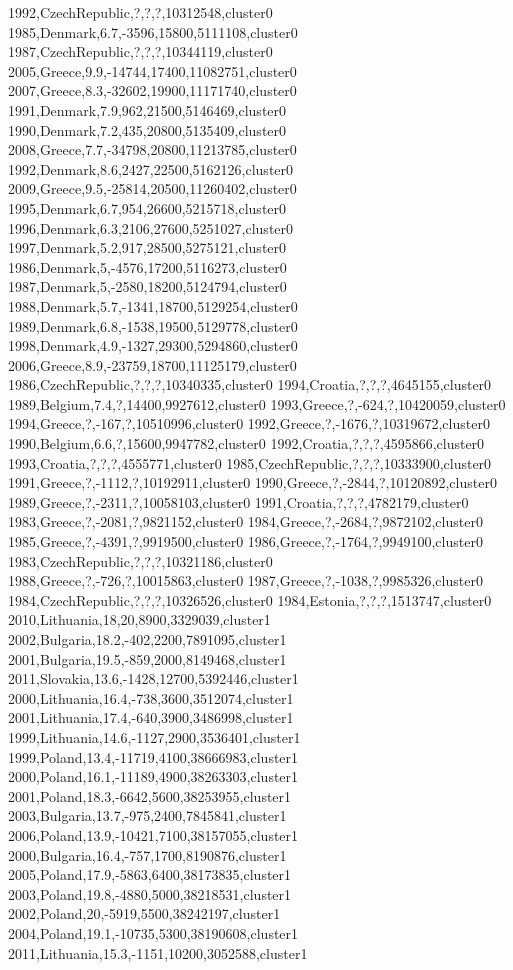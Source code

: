 1992,CzechRepublic,?,?,?,10312548,cluster0
1985,Denmark,6.7,-3596,15800,5111108,cluster0
1987,CzechRepublic,?,?,?,10344119,cluster0
2005,Greece,9.9,-14744,17400,11082751,cluster0
2007,Greece,8.3,-32602,19900,11171740,cluster0
1991,Denmark,7.9,962,21500,5146469,cluster0
1990,Denmark,7.2,435,20800,5135409,cluster0
2008,Greece,7.7,-34798,20800,11213785,cluster0
1992,Denmark,8.6,2427,22500,5162126,cluster0
2009,Greece,9.5,-25814,20500,11260402,cluster0
1995,Denmark,6.7,954,26600,5215718,cluster0
1996,Denmark,6.3,2106,27600,5251027,cluster0
1997,Denmark,5.2,917,28500,5275121,cluster0
1986,Denmark,5,-4576,17200,5116273,cluster0
1987,Denmark,5,-2580,18200,5124794,cluster0
1988,Denmark,5.7,-1341,18700,5129254,cluster0
1989,Denmark,6.8,-1538,19500,5129778,cluster0
1998,Denmark,4.9,-1327,29300,5294860,cluster0
2006,Greece,8.9,-23759,18700,11125179,cluster0
1986,CzechRepublic,?,?,?,10340335,cluster0
1994,Croatia,?,?,?,4645155,cluster0
1989,Belgium,7.4,?,14400,9927612,cluster0
1993,Greece,?,-624,?,10420059,cluster0
1994,Greece,?,-167,?,10510996,cluster0
1992,Greece,?,-1676,?,10319672,cluster0
1990,Belgium,6.6,?,15600,9947782,cluster0
1992,Croatia,?,?,?,4595866,cluster0
1993,Croatia,?,?,?,4555771,cluster0
1985,CzechRepublic,?,?,?,10333900,cluster0
1991,Greece,?,-1112,?,10192911,cluster0
1990,Greece,?,-2844,?,10120892,cluster0
1989,Greece,?,-2311,?,10058103,cluster0
1991,Croatia,?,?,?,4782179,cluster0
1983,Greece,?,-2081,?,9821152,cluster0
1984,Greece,?,-2684,?,9872102,cluster0
1985,Greece,?,-4391,?,9919500,cluster0
1986,Greece,?,-1764,?,9949100,cluster0
1983,CzechRepublic,?,?,?,10321186,cluster0
1988,Greece,?,-726,?,10015863,cluster0
1987,Greece,?,-1038,?,9985326,cluster0
1984,CzechRepublic,?,?,?,10326526,cluster0
1984,Estonia,?,?,?,1513747,cluster0
2010,Lithuania,18,20,8900,3329039,cluster1
2002,Bulgaria,18.2,-402,2200,7891095,cluster1
2001,Bulgaria,19.5,-859,2000,8149468,cluster1
2011,Slovakia,13.6,-1428,12700,5392446,cluster1
2000,Lithuania,16.4,-738,3600,3512074,cluster1
2001,Lithuania,17.4,-640,3900,3486998,cluster1
1999,Lithuania,14.6,-1127,2900,3536401,cluster1
1999,Poland,13.4,-11719,4100,38666983,cluster1
2000,Poland,16.1,-11189,4900,38263303,cluster1
2001,Poland,18.3,-6642,5600,38253955,cluster1
2003,Bulgaria,13.7,-975,2400,7845841,cluster1
2006,Poland,13.9,-10421,7100,38157055,cluster1
2000,Bulgaria,16.4,-757,1700,8190876,cluster1
2005,Poland,17.9,-5863,6400,38173835,cluster1
2003,Poland,19.8,-4880,5000,38218531,cluster1
2002,Poland,20,-5919,5500,38242197,cluster1
2004,Poland,19.1,-10735,5300,38190608,cluster1
2011,Lithuania,15.3,-1151,10200,3052588,cluster1
